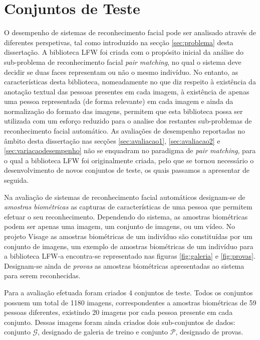 \section{Conjuntos de Teste}  \label{sec:conjuntos}
O desempenho de sistemas de reconhecimento facial pode ser analisado através de diferentes perspetivas, tal como introduzido na secção \ref{sec:problema} desta dissertação. A biblioteca LFW foi criada com o propósito inicial da análise do sub-problema de reconhecimento facial \textit{pair matching}, no qual o sistema deve decidir se duas faces representam ou não o mesmo indivíduo. No entanto, as características desta biblioteca, nomeadamente no que diz respeito à existência da anotação textual das pessoas presentes em cada imagem, à existência de apenas uma pessoa representada (de forma relevante) em cada imagem e ainda da normalização do formato das imagens, permitem que esta biblioteca possa ser utilizada com um esforço reduzido para o analise dos restantes sub-problemas de reconhecimento facial automático. As avaliações de desempenho reportadas no âmbito desta dissertação nas secções \ref{sec:avaliacao1}, \ref{sec:avaliacao2} e \ref{sec:variacaodesempenho} não se enquadram no paradigma de \textit{pair matching}, para o qual a biblioteca LFW foi originalmente criada, pelo que se tornou necessário o desenvolvimento de novos conjuntos de teste, os quais passamos a apresentar de seguida.

Na avaliação de sistemas de reconhecimento facial automáticos designam-se de \textit{amostras biométricas} as capturas de características de uma pessoa que permitem efetuar o seu reconhecimento. Dependendo do sistema, as amostras biométricas podem ser apenas uma imagem, um conjunto de imagens, ou um vídeo. No projeto Visage as amostras biométricas de um indivíduo são constituídas por um conjunto de imagens, um exemplo de amostras biométricas de um indivíduo para a biblioteca LFW-a encontra-se representado nas figuras \ref{fig:galeria}  e \ref{fig:provas}. Designam-se ainda de \textit{provas} as amostras biométricas apresentadas ao sistema para serem reconhecidas.

Para a avaliação efetuada foram criados 4 conjuntos de teste. Todos os conjuntos possuem um total de 1180 imagens, correspondentes a amostras biométricas de 59 pessoas diferentes, existindo 20 imagens por cada pessoa presente em cada conjunto. Dessas imagens foram ainda criados dois sub-conjuntos de dados: conjunto $\mathscr{G}$, designado de galeria de treino e conjunto $\mathscr{P}$, designado de provas.

